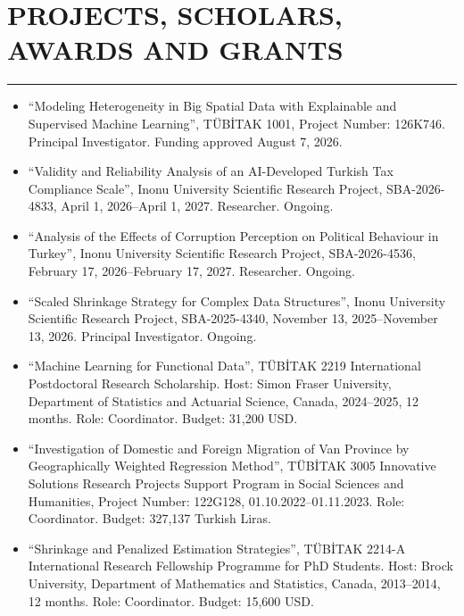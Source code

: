 \documentclass[10pt,letterpaper]{article}
\newcommand{\NewPart}[2]{%
	\Needspace{7\baselineskip}%
	\vspace{0.45em}%
	\section*{\sffamily\large\bfseries\color{MidnightBlue}\uppercase{#1} #2}%
	\vspace{-0.7em}\noindent\color{MidnightBlue}\rule{\textwidth}{0.55pt}\color{Black}\vspace{0.25em}}
\begin{document}
\NewPart{Projects, Scholars, Awards and Grants}{}

\begin{itemize}

\item ``Modeling Heterogeneity in Big Spatial Data with Explainable and Supervised Machine Learning'', T\"{U}B\.{I}TAK 1001, Project Number: 126K746. Principal Investigator. Funding approved August 7, 2026.

\item ``Validity and Reliability Analysis of an AI-Developed Turkish Tax Compliance Scale'', Inonu University Scientific Research Project, SBA-2026-4833, April 1, 2026--April 1, 2027. Researcher. Ongoing.

\item ``Analysis of the Effects of Corruption Perception on Political Behaviour in Turkey'', Inonu University Scientific Research Project, SBA-2026-4536, February 17, 2026--February 17, 2027. Researcher. Ongoing.

\item ``Scaled Shrinkage Strategy for Complex Data Structures'', Inonu University Scientific Research Project, SBA-2025-4340, November 13, 2025--November 13, 2026. Principal Investigator. Ongoing.




\item ``Machine Learning for Functional Data'', T\"{U}B\.{I}TAK 2219 International Postdoctoral Research Scholarship. Host: Simon Fraser University, Department of Statistics and Actuarial Science, Canada, 2024--2025, 12 months. Role: Coordinator. Budget: 31,200 USD.

\item ``Investigation of Domestic and Foreign Migration of Van Province by Geographically Weighted Regression Method'', T\"{U}B\.{I}TAK 3005 Innovative Solutions Research Projects Support Program in Social Sciences and Humanities, Project Number: 122G128, 01.10.2022--01.11.2023. Role: Coordinator. Budget: 327,137 Turkish Liras.

\item ``Shrinkage and Penalized Estimation Strategies'', T\"{U}B\.{I}TAK 2214-A International Research Fellowship Programme for PhD Students. Host: Brock University, Department of Mathematics and Statistics, Canada, 2013--2014, 12 months. Role: Coordinator. Budget: 15,600 USD.


\end{itemize}
\end{document}
